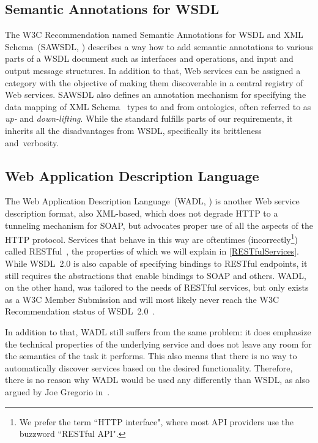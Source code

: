 \documentclass[runningheads,a4paper, twocolumn]{llncs}
\begin{document}
\subsection{Semantic Annotations for WSDL}
The W3C Recommendation named Semantic Annotations for WSDL and XML Schema~(SAWSDL, \cite{SAWSDL}) describes a way how to add semantic annotations to various parts of a WSDL document such as interfaces and operations, and input and output message structures. In addition to that, Web services can be assigned a category with the objective of making them discoverable in a central registry of Web services. SAWSDL also defines an annotation mechanism for specifying the data mapping of XML Schema~\cite{xmlschema11-1, xmlschema11-2} types to and from ontologies, often referred to as \emph{up-} and \emph{down-lifting}. While the standard fulfills parts of our requirements, it inherits all the disadvantages from WSDL, specifically its brittleness and~verbosity.

\subsection{Web Application Description Language}
The Web Application Description Language~(WADL, \cite{WADL}) is another Web service description format, also XML-based, which does not degrade HTTP to a tunneling mechanism for SOAP, but advocates proper use of all the aspects of the HTTP protocol. Services that behave in this way are oftentimes (incorrectly\footnote{We prefer the term ``HTTP interface", where most API providers use the buzzword ``RESTful API".}) called RESTful~\cite{FieldingREST}, the properties of which we will explain in \autoref{RESTfulServices}. While WSDL~2.0 is also capable of specifying bindings to RESTful endpoints, it still requires the abstractions that enable bindings to SOAP and others. WADL, on the other hand, was tailored to the needs of RESTful services, but only exists as a W3C Member Submission and will most likely never reach the W3C Recommendation status of WSDL~2.0~\cite{WADLTeamComment}.

In addition to that, WADL still suffers from the same problem: it does emphasize the technical properties of the underlying service and does not leave any room for the semantics of the task it performs. This also means that there is no way to automatically discover services based on the desired functionality. Therefore, there is no reason why WADL would be used any differently than WSDL, as also argued by Joe Gregorio in~\cite{GregorioWADL}.
\end{document}
